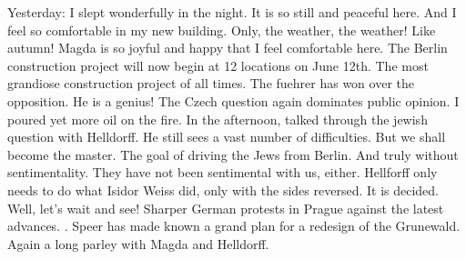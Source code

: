 
Yesterday: I slept wonderfully in the night. It is so still and peaceful here. And I feel so comfortable in my new building. Only, the weather, the weather! Like autumn! Magda is so joyful and happy that I feel comfortable here. The Berlin construction project will now begin at 12 locations on June 12th. The most grandiose construction project of all times. The fuehrer has won over the opposition. He is a genius! The Czech question again dominates public opinion. I poured yet more oil on the fire. \missing In the afternoon, talked through the jewish question with Helldorff. He still sees a vast number of difficulties. But we shall become the master. The goal of driving the Jews from Berlin. And truly without sentimentality. They have not been sentimental with us, either. Hellforff only needs to do what Isidor Weiss did, only with the sides reversed. It is decided. Well, let's wait and see! Sharper German protests in Prague against the latest advances. . Speer has made known a grand plan for a redesign of the Grunewald. Again a long parley with Magda and Helldorff. \missing